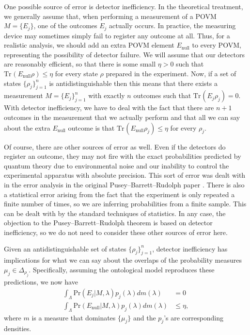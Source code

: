 \documentclass[DIV=calc,paper=a4,fontsize=11pt,twocolumn]{scrartcl} %
\theoremstyle{definition}
\theoremstyle{plain}
\newcommand{\Tr}[2][]{\ensuremath{\text{Tr}_{#1} \left ( #2 \right )}}
\begin{document}
One possible source of error is detector inefficiency.  In the
theoretical treatment, we generally assume that, when performing a
measurement of a POVM $M = \{E_j\}$, one of the outcomes $E_j$
actually occurs.  In practice, the measuring device may sometimes
simply fail to register any outcome at all.  Thus, for a realistic
analysis, we should add an extra POVM element $E_{\text{null}}$ to
every POVM, representing the possibility of detector failure.  We will
assume that our detectors are reasonably efficient, so that there is
some small $\eta > 0$ such that $\Tr{E_{\text{null}} \rho} \leq \eta$
for every state $\rho$ prepared in the experiment.  Now, if a set of
states $\{\rho_j \}_{j=1}^n$ is antidistinguishable then this means
that there exists a measurement $M = \{E_j\}_{j=1}^n$ with exactly $n$
outcomes such that $\Tr{E_j \rho_j} = 0$.  With detector inefficiency,
we have to deal with the fact that there are $n+1$ outcomes in the
measurement that we actually perform and that all we can say about the
extra $E_{\text{null}}$ outcome is that $\Tr{E_{\text{null}} \rho_j}
\leq \eta$ for every $\rho_j$.

Of course, there are other sources of error as well.  Even if the
detectors do register an outcome, they may not fire with the exact
probabilities predicted by quantum theory due to environmental noise
and our inability to control the experimental apparatus with absolute
precision.  This sort of error was dealt with in the error analysis in
the original Pusey--Barrett--Rudolph paper \cite{Pusey2012}.  There is also a statistical
error arising from the fact that the experiment is only repeated a
finite number of times, so we are inferring probabilities from a
finite sample.  This can be dealt with by the standard techniques of
statistics.  In any case, the objection to the Pusey--Barrett--Rudolph theorem is based on
detector inefficiency, so we do not need to consider these other
sources of error here.

Given an antidistinguishable set of states $\{\rho_j\}_{j=1}^n$,
detector inefficiency has implications for what we can say about the
overlaps of the probability measures $\mu_j \in \Delta_{\rho_j}$.
Specifically, assuming the ontological model reproduces these
predictions, we now have
\begin{align}
\int_{\Lambda} \text{Pr}(E_j|M,\lambda) p_j(\lambda) dm(\lambda) & =
0 \\
\int_{\Lambda} \text{Pr}(E_{\text{null}}|M,\lambda) p_j(\lambda)
dm(\lambda) & \leq \eta,
\end{align}
where $m$ is a measure that dominates $\{\mu_j\}$ and the $p_j$'s are
corresponding densities.
\end{document}
